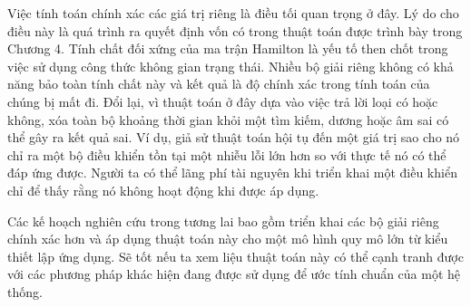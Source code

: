 \documentclass[12pt,a4paper]{article}
\theoremstyle{definition}
\newcommand{\hinf}{\text{\emph{H$_\infty$ }}}
\begin{document}
\medskip
Việc tính toán chính xác các giá trị riêng là điều tối quan trọng ở đây. Lý do cho điều này là quá trình ra quyết định vốn có trong thuật toán được trình bày trong Chương 4. Tính chất đối xứng của ma trận Hamilton là yếu tố then chốt trong việc sử dụng công thức không gian trạng thái. Nhiều bộ giải riêng không có khả năng bảo toàn tính chất này và kết quả là độ chính xác trong tính toán của chúng bị mất đi. Đổi lại, vì thuật toán ở đây dựa vào việc trả lời loại có hoặc không, xóa toàn bộ khoảng thời gian khỏi một tìm kiếm, dương hoặc âm sai có thể gây ra kết quả sai. Ví dụ, giả sử thuật toán hội tụ đến một giá trị sao cho nó chỉ ra một bộ điều khiển tồn tại một nhiễu lỗi lớn hơn so với thực tế nó có thể đáp ứng được. Người ta có thể lãng phí tài nguyên khi triển khai một điều khiển chỉ để thấy rằng nó không hoạt động khi được áp dụng.

\medskip
Các kế hoạch nghiên cứu trong tương lai bao gồm triển khai các bộ giải riêng chính xác hơn và áp dụng thuật toán này cho một mô hình quy mô lớn từ kiểu thiết lập ứng dụng. Sẽ tốt nếu ta xem liệu thuật toán này có thể cạnh tranh được với các phương pháp khác hiện đang được sử dụng để ước tính chuẩn \hinf của một hệ thống.
\end{document}
